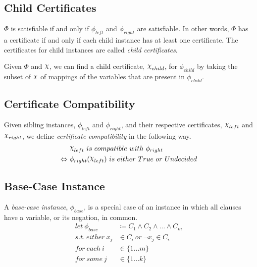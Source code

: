 \subsection*{Child Certificates}

$\Phi$ is satisfiable if and only if $\phi_{left}$ and $\phi_{right}$ are satisfiable.
In other words, $\Phi$ has a certificate if and only if each child instance has at least one certificate.
The certificates for child instances are called \textit{child certificates}.

Given $\Phi$ and $\rchi$, we can find a child certificate, $\rchi_{child}$, for $\phi_{child}$ by taking the subset of $\rchi$ of mappings of the variables that are present in $\phi_{child}$.


\subsection*{Certificate Compatibility}

Given sibling instances, $\phi_{left}$ and $\phi_{right}$, and their respective certificates, $\rchi_{left}$ and $\rchi_{right}$, we define \textit{certificate compatibility} in the following way.
\begin{align*}
    & \rchi_{left}~ is~ compatible~ with~ \phi_{right} \\
    \Leftrightarrow~ & \phi_{right}(\rchi_{left})~ is~ either~ True~ or~ Undecided
\end{align*}


\subsection*{Base-Case Instance}

A \textit{base-case instance}, $\phi_{base}$, is a special case of an instance in which all clauses have a variable, or its negation, in common.
\begin{align*}
    let~ \phi_{base} & \coloneqq C_1 \land C_2 \land \ldots \land C_m \\
    s.t.~ either~ x_j & \in C_i~ or~ \lnot x_j \in C_i \\
    for~ each~ i & \in \{ 1 \dots m \} \\
    for~ some~ j & \in \{ 1 \dots k \}
\end{align*}
